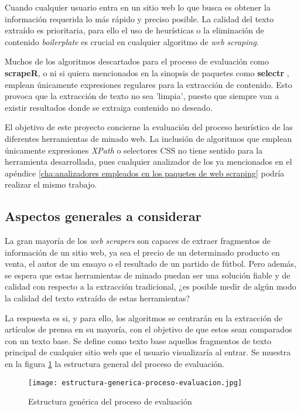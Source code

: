 Cuando cualquier usuario entra en un sitio web lo que busca es obtener la información requerida lo más
rápido y preciso posible. La calidad del texto extraído es prioritaria, para ello el uso de heurísticas o
la eliminación de contenido \emph{boilerplate} es crucial en cualquier algoritmo de \emph{web scraping}.

Muchos de los algoritmos descartados para el proceso de evaluación como \textbf{scrapeR}, o ni si quiera 
mencionados en la sinopsis de paquetes como \textbf{selectr} \cite{selectr}, emplean únicamente expresiones 
regulares para la extracción de contenido. Esto provoca que la extracción de texto no sea 'limpia', puesto 
que siempre van a existir resultados donde se extraiga contenido no deseado.

El objetivo de este proyecto concierne la evaluación del proceso heurístico de las diferentes herramientas
de minado web. La inclusión de algoritmos que emplean únicamente expresiones \emph{XPath} o selectores CSS 
no tiene sentido para la herramienta desarrollada, pues cualquier analizador de los ya mencionados en el
apéndice \ref{cha:analizadores empleados en los paquetes de web scraping} podría realizar el mismo trabajo.

\subsection{Aspectos generales a considerar}
\label{subsec:aspectos generales a considerar}

La gran mayoría de los \emph{web scrapers} son capaces de extraer fragmentos de información de un sitio
web, ya sea el precio de un determinado producto en venta, el autor de un ensayo o el resultado de un 
partido de fútbol. Pero además, se espera que estas herramientas de minado puedan ser una solución fiable 
y de calidad con respecto a la extracción tradicional, ¿es posible medir de algún modo la calidad del texto 
extraído de estas herramientas?

La respuesta es si, y para ello, los algoritmos se centrarán en la extracción de artículos de prensa en su
mayoría, con el objetivo de que estos sean comparados con un texto base. Se define como texto base aquellos 
fragmentos de texto principal de cualquier sitio web que el usuario visualizaría al entrar. Se muestra en 
la figura \ref{img:estructura generica del proceso de evaluacion} la estructura general del proceso de 
evaluación.

\begin{figure}[tphb]
  \centering
  \texttt{[image: estructura-generica-proceso-evaluacion.jpg]}
  \caption{Estructura genérica del proceso de evaluación}
  \label{img:estructura generica del proceso de evaluacion}
\end{figure}

